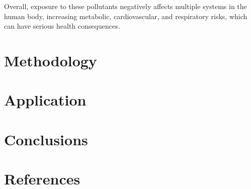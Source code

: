 \documentclass[twocolumn]{article}
\begin{document}
Overall, exposure to these pollutants negatively affects multiple systems in the human body, increasing metabolic, cardiovascular, and respiratory risks, which can have serious health consequences.



\section{Methodology}



\section{Application}


\section{Conclusions}


\section{References}
\begin{thebibliography}{9}
\setlength{\itemsep}{0pt}
\setlength{\parskip}{0pt}




\end{thebibliography}
\end{document}

